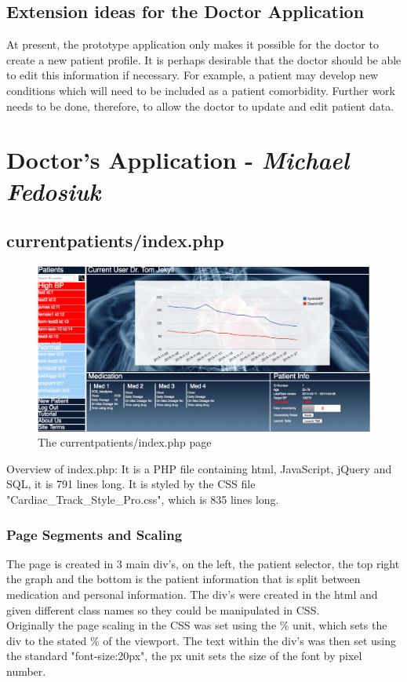 \documentclass[11pt]{article}
\begin{document}
\subsection{Extension ideas for the Doctor Application}
At present, the prototype application only makes it possible for the doctor to create a new patient profile. It is perhaps desirable that the doctor should be able to edit this information if necessary. For example, a patient may develop new conditions which will need to be included as a patient comorbidity. Further work needs to be done, therefore, to allow the doctor to update and edit patient data.

\clearpage


\section{Doctor's Application - \textit{Michael Fedosiuk}} \label{drapp:MF}
\subsection{currentpatients/index.php}
\begin{figure}[h!] 
\includegraphics[width=\linewidth]{indexover.png}
\caption{The currentpatients/index.php page \label{indexover}}
\end{figure} 
\noindent 
Overview of index.php: It is a PHP file containing html, JavaScript, jQuery and SQL, it is 791 lines long. It is styled by the CSS file "Cardiac\_Track\_Style\_Pro.css", which is 835 lines long. 
\subsubsection{Page Segments and Scaling}
The page is created in 3 main div's, on the left, the patient selector, the top right the graph and the bottom is the patient information that is split between medication and personal information. The div's were created in the html and given different class names so they could be manipulated in CSS. 
\\ \indent
Originally the page scaling in the CSS was set using the \% unit, which sets the div to the stated \% of the viewport. The text within the div's was then set using the standard "font-size:20px", the px unit sets the size of the font by pixel number. 
\end{document}
